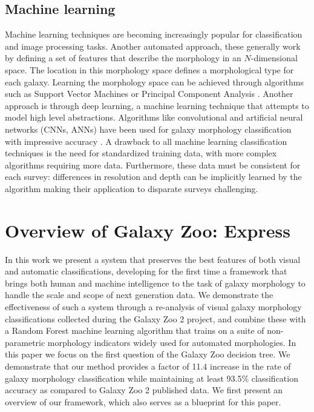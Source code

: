 \subsection{Machine learning}
Machine learning techniques are becoming increasingly popular for classification and image processing tasks. Another automated approach, these generally work by defining a set of features that describe the morphology in an $N$-dimensional space. The location in this morphology space defines a morphological type for each galaxy. Learning the morphology space can be achieved through algorithms such as Support Vector Machines \citep{HuertasCompany2008} or Principal Component Analysis \citep{Watanabe1985, Scarlata2007}. Another approach is through deep learning, a machine learning technique that attempts to model high level abstractions. Algorithms like convolutional and artificial neural networks (CNNs, ANNs) have been used for galaxy morphology classification with impressive accuracy 
\citep{Ball2004, 
	Banerji2010, 
	Dieleman2015, 
	HuertasCompany2015}. 
A drawback to all machine learning classification techniques is the need for standardized training data, with more complex algorithms requiring more data. Furthermore, these data must be consistent for each survey: differences in resolution and depth can be implicitly learned by the algorithm making their application to disparate surveys challenging. 


\section{Overview of Galaxy Zoo: Express}

 In this work we present a system that preserves the best features of both visual and automatic classifications, developing for the first time a framework that brings both human and machine intelligence to the task of galaxy morphology to handle the scale and scope of next generation data. We demonstrate the effectiveness of such a system through a re-analysis of visual galaxy morphology classifications collected during the Galaxy Zoo 2 project, and combine these with a Random Forest machine learning algorithm that trains on a suite of non-parametric morphology indicators widely used for automated morphologies. In this paper we focus on the first question of the Galaxy Zoo decision tree. We demonstrate that our method provides a factor of 11.4 increase in the rate of galaxy morphology classification  while maintaining at least 93.5\% classification accuracy as compared to Galaxy Zoo 2 published data. We first present an overview of our framework, which also serves as a blueprint for this paper. 


